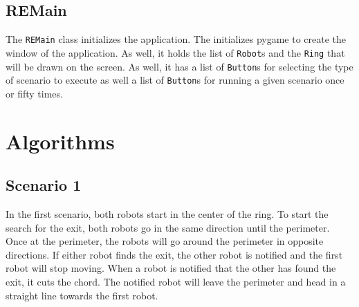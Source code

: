 \documentclass[12pt,letterpaper]{article}
\newcommand{\tableheader}{\rowfont\bf\rowcolor{thcolor!30}}
\begin{document}
    \subsection{REMain}
        The \texttt{REMain} class initializes the application. The initializes pygame to create the window of the application. As well, it holds the list of \texttt{Robot}s and the \texttt{Ring} that will be drawn on the screen. As well, it has a list of \texttt{Button}s for selecting the type of scenario to execute as well a list of \texttt{Button}s for running a given scenario once or fifty times.

        
    \section{Algorithms}
    \subsection{Scenario 1}
        In the first scenario, both robots start in the center of the ring. To start the search for the exit, both robots go in the same direction until the perimeter. Once at the perimeter, the robots will go around the perimeter in opposite directions. If either robot finds the exit, the other robot is notified and the first robot will stop moving. When a robot is notified that the other has found the exit, it cuts the chord. The notified robot will leave the perimeter and head in a straight line towards the first robot.
        
\end{document}
